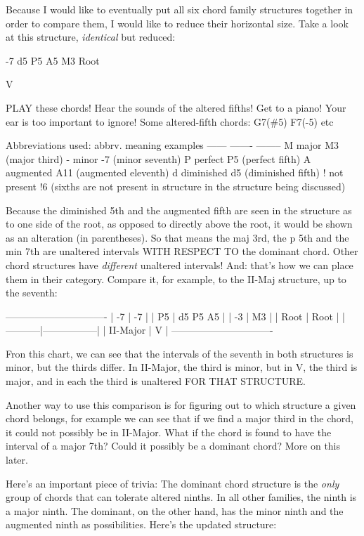 Because I would like to eventually put all six chord family structures
together in order to compare them, I would like to reduce their horizontal
size. Take a look at this structure, \emph{identical} but reduced:

       -7
  d5   P5   A5
       M3
      Root

        V

PLAY these chords! Hear the sounds of the altered fifths! Get to a piano! Your
ear is too important to ignore! Some altered-fifth chords: G7(\#5) F7(-5) etc

Abbreviations used: 
abbrv.  meaning           examples
------  -------           --------
  M      major         M3 (major third)
  -      minor         -7 (minor seventh)
  P      perfect       P5 (perfect fifth)
  A     augmented     A11 (augmented eleventh)
  d     diminished     d5 (diminished fifth)
  !     not present    !6 (sixths are not present
        in structure       in the structure being
                           discussed)

Because the diminished 5th and the augmented fifth are seen in the structure as
to one side of the root, as opposed to directly above the root, it would be 
shown as an alteration (in parentheses). So that means the maj 3rd, the p 5th
and the min 7th are unaltered intervals WITH RESPECT TO the dominant chord.
Other chord structures have \emph{different} unaltered intervals! And: that's how
we can place them in their category. Compare it, for example, to the II-Maj
structure, up to the seventh:

-------------------------------
|    -7     |       -7        |
|    P5     |  d5   P5   A5   |
|    -3     |       M3        |
|   Root    |      Root       |
|-----------|-----------------|
| II-Major  |        V        |
-------------------------------

Fron this chart, we can see that the intervals of the seventh in both
structures is minor, but the thirds differ. In II-Major, the third is
minor, but in V, the third is major, and in each the third is unaltered
FOR THAT STRUCTURE.

Another way to use this comparison is for figuring out to which structure
a given chord belongs, for example we can see that if we find a major
third in the chord, it could not possibly be in II-Major. What if the
chord is found to have the interval of a major 7th? Could it possibly
be a dominant chord? More on this later.

Here's an important piece of trivia: The dominant chord structure is the
\emph{only} group of chords that can tolerate altered ninths. In all other
families, the ninth is a major ninth. The dominant, on the other hand,
has the minor ninth and the augmented ninth as possibilities. Here's the
updated structure:

